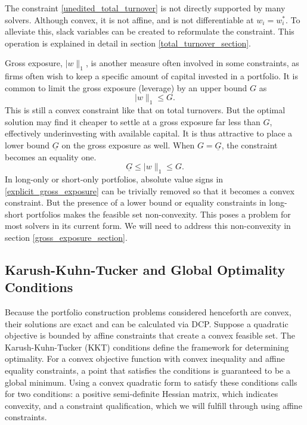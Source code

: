 \documentclass[11pt, letterpaper]{article}
\begin{document}
The constraint \eqref{unedited_total_turnover} is not directly supported by many solvers. Although convex, it is not affine, and
is not differentiable at $w_i = w_i^*$. To alleviate this, slack variables can be created to reformulate the constraint. This
operation is explained in detail in section \ref{total_turnover_section}.

Gross exposure, $\lvert w\rVert_1$, is another measure often involved in some constraints, as firms often wish to keep a
specific amount of capital invested in a portfolio. It is common to limit the gross exposure (leverage) by an upper bound $G$ as
\begin{equation*}
	\lvert w\rVert_1 \leq G.
\end{equation*}
This is still a convex constraint like that on total turnovers. But the optimal solution may find it cheaper to settle at a
gross exposure far less than $G$, effectively underinvesting with available capital. It is thus attractive to place a lower
bound $\underline{G}$ on the gross exposure as well. When $G=\underline{G}$, the constraint becomes an equality one.
\begin{equation}
  \label{explicit_gross_exposure}
  \underline{G} \leq	\lvert w\rVert_1 \leq G.
\end{equation}
In long-only or short-only portfolios, absolute value signs in \eqref{explicit_gross_exposure} can be trivially removed so that
it becomes a convex constraint. But the presence of a lower bound or equality constraints in long-short portfolios makes the
feasible set non-convexity. This poses a problem for most solvers in its current form. We will need to address this
non-convexity in section \ref{gross_exposure_section}.

\subsection{Karush-Kuhn-Tucker and Global Optimality Conditions}
\label{KKT_section}
Because the portfolio construction problems considered henceforth are convex, their solutions are
exact and can be calculated via DCP. Suppose a quadratic objective is bounded by affine constraints that
create a convex feasible set. The Karush-Kuhn-Tucker (KKT) conditions \cite{boyd2004KKT} define the framework for determining
optimality. For a convex objective function with convex inequality and affine equality constraints, a point
that satisfies the conditions is guaranteed to be a global minimum. Using a convex quadratic form to satisfy these conditions
calls for two conditions: a positive semi-definite Hessian matrix, which indicates convexity, and a
constraint qualification, which we will fulfill through using affine constraints.
\end{document}

